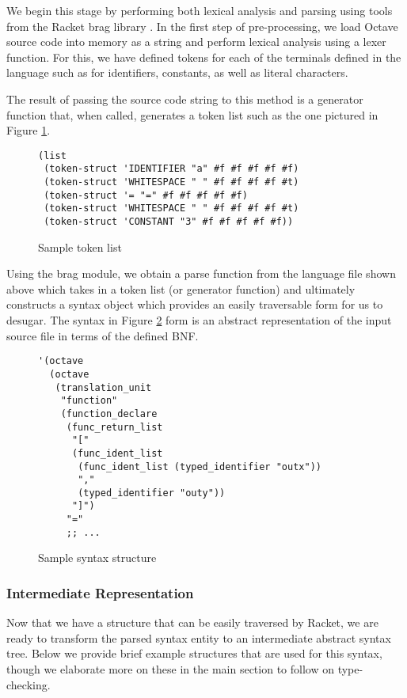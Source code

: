 We begin this stage by performing both lexical analysis and parsing using tools from the Racket brag library \cite{bragdocs}. In the first step of pre-processing, we load Octave source code into memory as a string and perform lexical analysis using a lexer function. For this, we have defined tokens for each of the terminals defined in the language such as for identifiers, constants, as well as literal characters.

The result of passing the source code string to this method is a generator function that, when called, generates a token list such as the one pictured in Figure \ref{fig:token}.

\begin{figure}[h]
    \begin{lstlisting}[language=racket]
(list
 (token-struct 'IDENTIFIER "a" #f #f #f #f #f)
 (token-struct 'WHITESPACE " " #f #f #f #f #t)
 (token-struct '= "=" #f #f #f #f #f)
 (token-struct 'WHITESPACE " " #f #f #f #f #t)
 (token-struct 'CONSTANT "3" #f #f #f #f #f))
    \end{lstlisting}
    \caption[]{Sample token list}
    \label{fig:token}
\end{figure}

Using the brag module, we obtain a parse function from the language file shown above which takes in a token list (or generator function) and ultimately constructs a syntax object \cite{racketstxobj} which provides an easily traversable form for us to desugar. The syntax in Figure \ref{fig:syntax} form is an abstract representation of the input source file in terms of the defined BNF. 

\begin{figure}[h]
    \begin{lstlisting}[language=racket]
'(octave
  (octave
   (translation_unit
    "function"
    (function_declare
     (func_return_list
      "["
      (func_ident_list
       (func_ident_list (typed_identifier "outx"))
       ","
       (typed_identifier "outy"))
      "]")
     "="
     ;; ...
    \end{lstlisting}
    \caption[]{Sample syntax structure}
    \label{fig:syntax}
\end{figure}

\subsubsection{Intermediate Representation}
Now that we have a structure that can be easily traversed by Racket, we are ready to transform the parsed syntax entity to an intermediate abstract syntax tree. Below we provide brief example structures that are used for this syntax, though we elaborate more on these in the main section to follow on type-checking.

